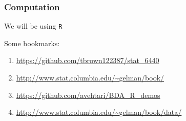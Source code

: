 \documentclass{beamer}
\begin{document}
\begin{frame}
\frametitle{Computation}

We will be using \texttt{R}
\newline


Some bookmarks:
\begin{enumerate}
\item \url{https://github.com/tbrown122387/stat_6440} 
\item \url{http://www.stat.columbia.edu/~gelman/book/}
\item \url{https://github.com/avehtari/BDA_R_demos}
\item \url{http://www.stat.columbia.edu/~gelman/book/data/}
\end{enumerate}



\end{frame}
\end{document}
